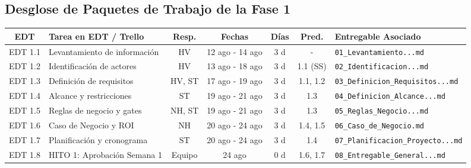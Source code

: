 \documentclass[12pt,a4paper]{article}
\begin{document}
\subsection{Desglose de Paquetes de Trabajo de la Fase 1}
\begin{table}[h!]
\centering
\scriptsize
\renewcommand{\arraystretch}{1.15}
\begin{tabularx}{\textwidth}{|c|>{\raggedright\arraybackslash}p{4.0cm}|c|c|c|c|X|}
\hline
\rowcolor{tableheader}
EDT & Tarea en EDT / Trello & Resp. & Fechas & Días & Pred. & Entregable Asociado \\
\hline
EDT 1.1 & Levantamiento de información & HV & 12 ago - 14 ago & 3 d & - & \texttt{01\_Levantamiento...md} \\
\hline
EDT 1.2 & Identificación de actores & HV & 13 ago - 18 ago & 3 d & 1.1 (SS) & \texttt{02\_Identificacion...md} \\
\hline
EDT 1.3 & Definición de requisitos & HV, ST & 17 ago - 19 ago & 3 d & 1.1, 1.2 & \texttt{03\_Definicion\_Requisitos...md} \\
\hline
EDT 1.4 & Alcance y restricciones & ST & 19 ago - 21 ago & 3 d & 1.3 & \texttt{04\_Definicion\_Alcance...md} \\
\hline
EDT 1.5 & Reglas de negocio y gates & NH, ST & 19 ago - 21 ago & 3 d & 1.3 & \texttt{05\_Reglas\_Negocio...md} \\
\hline
EDT 1.6 & Caso de Negocio y ROI & NH & 20 ago - 24 ago & 3 d & 1.4, 1.5 & \texttt{06\_Caso\_de\_Negocio.md} \\
\hline
EDT 1.7 & Planificación y cronograma & ST & 20 ago - 24 ago & 3 d & 1.4 & \texttt{07\_Planificacion\_Proyecto...md} \\
\hline
EDT 1.8 & HITO 1: Aprobación Semana 1 & Equipo & 24 ago & 0 d & 1.6, 1.7 & \texttt{08\_Entregable\_General...md} \\
\hline
\end{tabularx}
\end{table}
\end{document}
